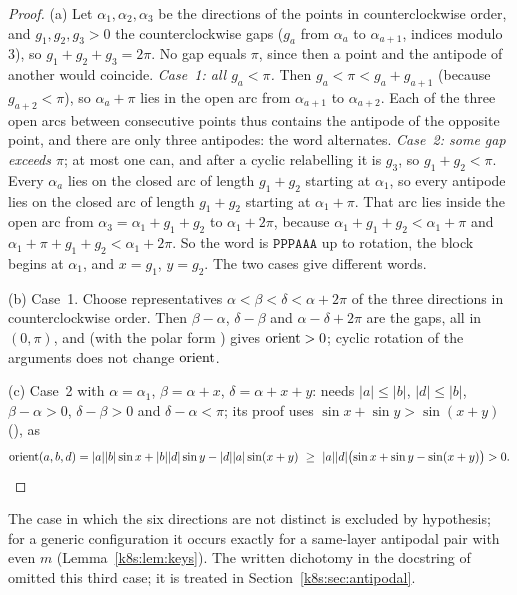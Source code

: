 \begin{proof}
(a) Let $\alpha_1,\alpha_2,\alpha_3$ be the directions of the points in counterclockwise order, and $g_1,g_2,g_3>0$ the
counterclockwise gaps ($g_a$ from $\alpha_a$ to $\alpha_{a+1}$, indices modulo $3$), so $g_1+g_2+g_3=2\pi$. No gap equals
$\pi$, since then a point and the antipode of another would coincide. \emph{Case~1: all $g_a<\pi$.} Then
$g_a<\pi<g_a+g_{a+1}$ (because $g_{a+2}<\pi$), so $\alpha_a+\pi$ lies in the open arc from $\alpha_{a+1}$ to $\alpha_{a+2}$.
Each of the three open arcs between consecutive points thus contains the antipode of the opposite point, and there are
only three antipodes: the word alternates. \emph{Case~2: some gap exceeds $\pi$}; at most one can, and after a cyclic
relabelling it is $g_3$, so $g_1+g_2<\pi$. Every $\alpha_a$ lies on the closed arc of length $g_1+g_2$ starting at
$\alpha_1$, so every antipode lies on the closed arc of length $g_1+g_2$ starting at $\alpha_1+\pi$. That arc lies inside
the open arc from $\alpha_3=\alpha_1+g_1+g_2$ to $\alpha_1+2\pi$, because $\alpha_1+g_1+g_2<\alpha_1+\pi$ and
$\alpha_1+\pi+g_1+g_2<\alpha_1+2\pi$. So the word is $\mathtt{PPPAAA}$ up to rotation, the block begins at $\alpha_1$, and
$x=g_1$, $y=g_2$. The two cases give different words.

(b) Case~1. Choose representatives $\alpha<\beta<\delta<\alpha+2\pi$ of the three directions in counterclockwise order.
Then $\beta-\alpha$, $\delta-\beta$ and $\alpha-\delta+2\pi$ are the gaps, all in $(0,\pi)$, and
 (with the polar form ) gives $\operatorname{orient}>0$; cyclic rotation of the
arguments does not change $\operatorname{orient}$.

(c) Case~2 with $\alpha=\alpha_1$, $\beta=\alpha+x$, $\delta=\alpha+x+y$:  needs $|a|\le|b|$,
$|d|\le|b|$, $\beta-\alpha>0$, $\delta-\beta>0$ and $\delta-\alpha<\pi$; its proof uses
$\sin x+\sin y>\sin(x+y)$ (), as
\[
\operatorname{orient}(a,b,d)=|a||b|\sin x+|b||d|\sin y-|d||a|\sin(x+y)\ \ge\ |a||d|\bigl(\sin x+\sin y-\sin(x+y)\bigr)>0.\qedhere
\]
\end{proof}

The case in which the six directions are not distinct is excluded by hypothesis; for a generic configuration it
occurs exactly for a same-layer antipodal pair with even $m$ (Lemma~\ref{k8s:lem:keys}). The written dichotomy in the
docstring of  omitted this third case; it is treated in Section~\ref{k8s:sec:antipodal}.

